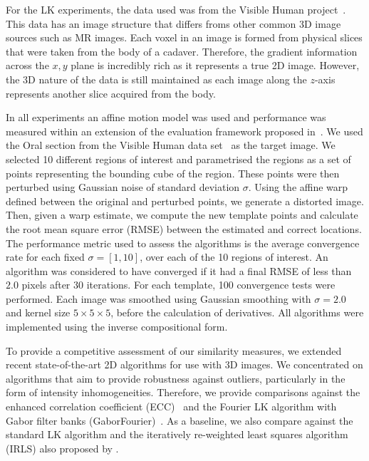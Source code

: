 For the LK experiments, the data used was from the Visible Human
project~\cite{spitzer1996visiblehuman}. 
This data has an image structure that differs froms
other common 3D image sources such as MR images. Each voxel in an image is
formed from physical slices that were taken from the body of a cadaver.
Therefore, the gradient information across the $x, y$ plane is incredibly rich
as it represents a true 2D image. However, the 3D nature of the data is still
maintained as each image along the $z$-axis represents another slice acquired
from the body.

In all experiments an affine motion model was used and performance was measured
within an extension of the evaluation framework proposed 
in~\cite{tzimiropoulos2011robust}.
We used the Oral section from the Visible Human data 
set~\cite{spitzer1996visiblehuman} as
the target image. We selected 10 different regions of interest and parametrised
the regions as a set of points representing the bounding cube of the region.
These points were then perturbed using Gaussian noise of standard deviation
$\sigma$. Using the affine warp defined between the original and perturbed
points, we generate a distorted image. Then, given a warp estimate, we compute
the new template points and calculate the root mean square error (RMSE) between
the estimated and correct locations. The performance metric used to assess the
algorithms is the average convergence rate for each fixed $\sigma = [1, 10]$,
over each of the 10 regions of interest. An algorithm was considered to have
converged if it had a final RMSE of less than $2.0$ pixels after 30 iterations.
For each template, 100 convergence tests were performed. Each image was smoothed
using Gaussian smoothing with $\sigma = 2.0$ and kernel size $5\times5\times5$,
before the calculation of derivatives. All algorithms were implemented using the
inverse compositional form.

To provide a competitive assessment of our similarity measures, we extended
recent state-of-the-art 2D algorithms for use with 3D images. We concentrated on
algorithms that aim to provide robustness against outliers, particularly in the
form of intensity inhomogeneities. Therefore, we provide comparisons against the
enhanced correlation coefficient (ECC)~\cite{evangelidis2008parametric} 
and the Fourier LK
algorithm with Gabor filter banks (GaborFourier)~\cite{lucey2013fourier}. As a
baseline, we also compare against the standard LK algorithm and the iteratively
re-weighted least squares algorithm (IRLS) also proposed by
\citet{baker2005lk20yearsonpart5}.

